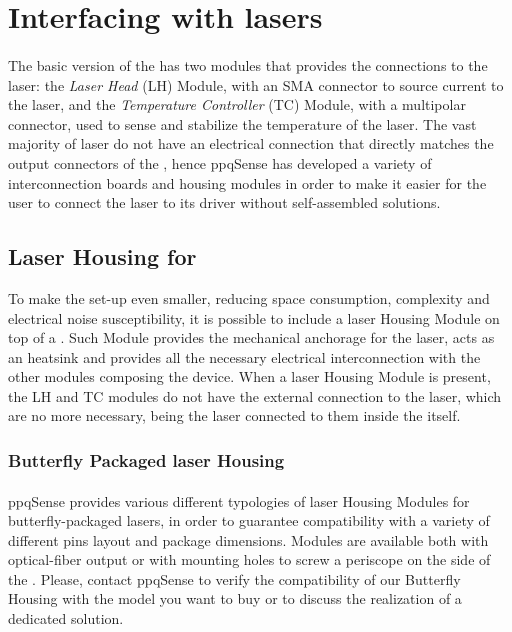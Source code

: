 \section{Interfacing with lasers} \label{cpt:laser_interface}
\paragraph{} The basic version of the \QubeModel  has two modules that provides the connections to the laser: the \textit{Laser Head} (LH) Module, with an SMA connector to source current to the laser, and the \textit{Temperature Controller} (TC) Module, with a multipolar connector, used to sense and stabilize the temperature of the laser.
\newline The vast majority of laser do not have an electrical connection that directly matches the output connectors of the \QubeModel , hence ppqSense has developed a variety of interconnection boards and housing modules in order to make it easier for the user to connect the laser to its driver without self-assembled solutions.





\subsection{Laser Housing for \QubeModel }
To make the set-up even smaller, reducing space consumption, complexity and electrical noise susceptibility, it is possible to include a laser Housing Module on top of a \QubeModel . Such Module provides the mechanical anchorage for the laser, acts as an heatsink and provides all the necessary electrical interconnection with the other modules composing the \QubeModel  device. When a laser Housing Module is present, the LH and TC modules do not have the external connection to the laser, which are no more necessary, being the laser connected to them inside the \QubeModel  itself.





\subsubsection{Butterfly Packaged laser Housing}
\paragraph{} ppqSense provides various different typologies of laser Housing Modules for butterfly-packaged lasers, in order to guarantee compatibility with a variety of different pins layout and package dimensions. Modules are available both with optical-fiber output or with mounting holes to screw a periscope on the side of the \QubeModel .
\newline Please, contact ppqSense to verify the compatibility of our Butterfly Housing with the model you want to buy or to discuss the realization of a dedicated solution.




